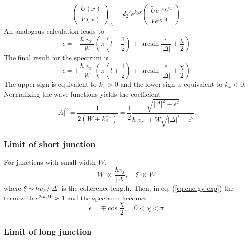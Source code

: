 \begin{equation}
\begin{pmatrix} U(x) \\ V(x) \end{pmatrix}_L = d_2' e^{ \tilde{k}_S x } \begin{pmatrix} \tilde{U} e^{-i \chi / 4}\\ \tilde{V} e^{i \chi / 4} \end{pmatrix}
\end{equation}
An analogous calculation leads to
\begin{equation}
\epsilon = - \frac{\hbar |v_x|}{W} \left( \pi \left(l - \frac{1}{2} \right) + \arcsin \frac{\epsilon}{|\Delta|} + \frac{\chi}{2} \right)
\end{equation}
The final result for the spectrum is
\begin{equation}
\epsilon = \pm \frac{\hbar |v_x|}{W} \left( \pi \left(l \pm \frac{1}{2} \right) \mp \arcsin \frac{\epsilon}{|\Delta|} + \frac{\chi}{2} \right)
\end{equation}
The upper sign is equivalent to $k_x > 0$ and the lower sign is equivalent to $k_x  <0 $.\\
Normalizing the wave functions yields the coefficient
\begin{equation}
|A|^2 = \frac{1}{2(W+ k_S^{-1})} = \frac{1}{2} \frac{\sqrt{|\Delta|^2 - \epsilon^2}}{\hbar |v_x| + W \sqrt{|\Delta|^2 - \epsilon^2}}.
\end{equation}
\subsubsection*{Limit of short junction}

For junctions with small width $W$,
\begin{equation}
W \ll \frac{\hbar v_x }{|\Delta|}, \quad \xi \ll W
\end{equation}
where $\xi \sim \hbar v_F / |\Delta|$ is the coherence length. Then, in eq. (\ref{eq:energy-exp}) the term with $e^{2i k_n W} \approx 1$ and the spectrum becomes
\begin{equation}
\epsilon = \mp \cos \frac{\chi}{2}, \quad 0 < \chi < \pi
\end{equation}

\subsubsection*{Limit of long junction}

